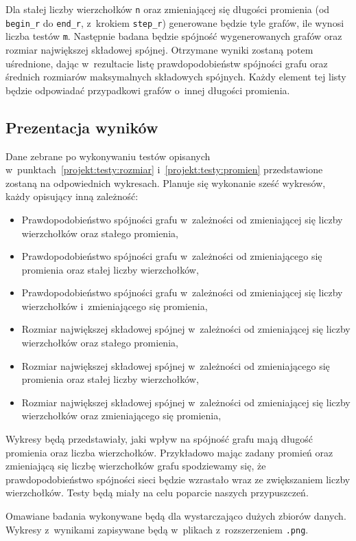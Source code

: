 		Dla stałej liczby wierzchołków \texttt{n} oraz zmieniającej się długości promienia (od \texttt{begin\_r} do \texttt{end\_r}, z~krokiem \texttt{step\_r}) generowane będzie tyle grafów, ile wynosi liczba testów \texttt{m}. Następnie badana będzie spójność wygenerowanych grafów oraz rozmiar największej składowej spójnej. Otrzymane wyniki zostaną potem uśrednione, dając w~rezultacie listę prawdopodobieństw spójności grafu oraz średnich rozmiarów maksymalnych składowych spójnych. Każdy element tej listy będzie odpowiadać przypadkowi grafów o~innej długości promienia.

	\subsection{Prezentacja wyników}
		\label{projekt:testy:wyniki}

		Dane zebrane po wykonywaniu testów opisanych w~punktach~\ref{projekt:testy:rozmiar} i~\ref{projekt:testy:promien} przedstawione zostaną na odpowiednich wykresach. Planuje się wykonanie sześć wykresów, każdy opisujący inną zależność:
		\begin{itemize}
			\item Prawdopodobieństwo spójności grafu w~zależności od zmieniającej się liczby wierzchołków oraz stałego promienia,
			\item Prawdopodobieństwo spójności grafu w~zależności od zmieniającego się promienia oraz stałej liczby wierzchołków,
			\item Prawdopodobieństwo spójności grafu w~zależności od zmieniającej się liczby wierzchołków i~zmieniającego się promienia,
			\item Rozmiar największej składowej spójnej w~zależności od zmieniającej się liczby wierzchołków oraz stałego promienia,
			\item Rozmiar największej składowej spójnej w~zależności od zmieniającego się promienia oraz stałej liczby wierzchołków,
			\item Rozmiar największej składowej spójnej w~zależności od zmieniającej się liczby wierzchołków oraz zmieniającego się promienia,
		\end{itemize}

		Wykresy będą przedstawiały, jaki wpływ na spójność grafu mają długość promienia oraz liczba wierzchołków. Przykładowo mając zadany promień oraz zmieniającą się liczbę wierzchołków grafu spodziewamy się, że prawdopodobieństwo spójności sieci będzie wzrastało wraz ze zwiększaniem liczby wierzchołków. Testy będą miały na celu poparcie naszych przypuszczeń.

		Omawiane badania wykonywane będą dla wystarczająco dużych zbiorów danych. Wykresy z~wynikami zapisywane będą w~plikach z~rozszerzeniem \texttt{.png}.
